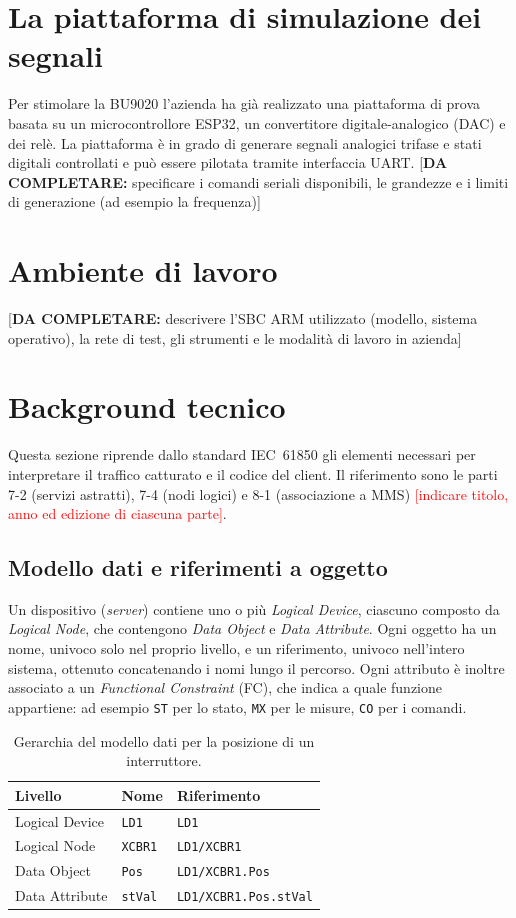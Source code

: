\documentclass[11pt,a4paper,italian,oneside,openany]{book}
\newcommand{\daf}[1]{{\color{red}[\textbf{DA COMPLETARE:} #1]}}
\begin{document}
\section{La piattaforma di simulazione dei segnali}
Per stimolare la BU9020 l'azienda ha già realizzato una piattaforma di prova basata su un microcontrollore ESP32, un convertitore digitale-analogico (DAC) e dei relè. La piattaforma è in grado di generare segnali analogici trifase e stati digitali controllati e può essere pilotata tramite interfaccia UART. \daf{specificare i comandi seriali disponibili, le grandezze e i limiti di generazione (ad esempio la frequenza)}

\section{Ambiente di lavoro}
\daf{descrivere l'SBC ARM utilizzato (modello, sistema operativo), la rete di test, gli strumenti e le modalità di lavoro in azienda}

\section{Background tecnico}\label{sec:background}
Questa sezione riprende dallo standard IEC~61850 gli elementi necessari per interpretare il traffico catturato e il codice del client. Il riferimento sono le parti 7-2 (servizi astratti), 7-4 (nodi logici) e 8-1 (associazione a MMS)
\textcolor{red}{[indicare titolo, anno ed edizione di ciascuna parte]}.

\subsection{Modello dati e riferimenti a oggetto}
Un dispositivo (\textit{server}) contiene uno o più \textit{Logical Device}, ciascuno composto da \textit{Logical Node}, che contengono \textit{Data Object} e \textit{Data Attribute}. Ogni oggetto ha un nome, univoco solo nel proprio livello, e un riferimento, univoco nell'intero sistema, ottenuto concatenando i nomi lungo il percorso. Ogni attributo è inoltre associato a un \textit{Functional Constraint} (FC), che indica a quale funzione appartiene: ad esempio \texttt{ST} per lo stato, \texttt{MX} per le misure, \texttt{CO} per i comandi.

\begin{table}[ht]
\centering
\begin{tabular}{@{}lll@{}}
\toprule
Livello & Nome & Riferimento \\
\midrule
Logical Device & \texttt{LD1} & \texttt{LD1} \\
Logical Node & \texttt{XCBR1} & \texttt{LD1/XCBR1} \\
Data Object & \texttt{Pos} & \texttt{LD1/XCBR1.Pos} \\
Data Attribute & \texttt{stVal} & \texttt{LD1/XCBR1.Pos.stVal} \\
\bottomrule
\end{tabular}
\caption{Gerarchia del modello dati per la posizione di un interruttore.}
\label{tab:riferimenti}
\end{table}
\end{document}
